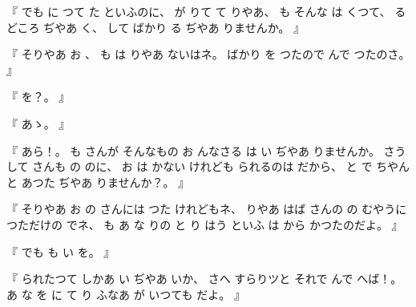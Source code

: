 %
『
でも
に
つて
た
といふのに、
%
が
りて
て
りやあ、
%
も
そんな
は
くつて、
%
る
どころ
ぢやあ
く、
%
して
ばかり
る
ぢやあ
りませんか。
』

%
『
そりやあ
お
、
%
も
は
りやあ
ないはネ。
%
ばかり
を
つたので
んで
つたのさ。
』

%
『
を？。
』


%
『
あゝ。
』

%
『
あら！。
%
も
さんが
そんなもの
お
んなさる
は
い
ぢやあ
りませんか。
%
さうして
さんも
の
のに、
%
お
は
かない
けれども
られるのは
だから、
%
と
で
ちやんと
あつた%
ぢやあ
りませんか？。
』

%
『
そりやあ
お
の
さんには
つた
けれどもネ、
%
りやあ
はば
さんの
の
むやうに
つただけの%
でネ、
%
も
あ
な
りの
と
り
はう
といふ
は
から
かつたのだよ。
』

%
『
でも
も
い
を。
』

%
『
られたつて
しかあ
い
ぢやあ
いか、
%
さへ
すらりツと
それで
んで
へば！。
%
あ
な
を
に
て
り
ふなあ
が
いつても
だよ。
』

